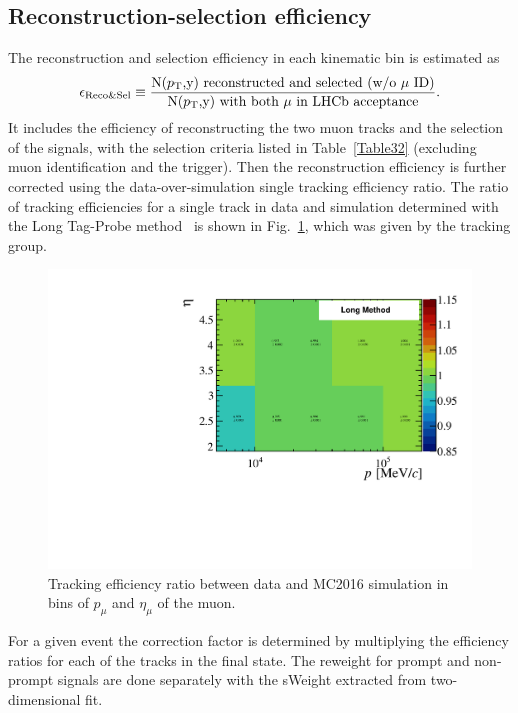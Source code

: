 \subsection{Reconstruction-selection efficiency}
The reconstruction and selection efficiency in each kinematic bin is estimated as
\begin{equation}
\epsilon_{\mathrm{Reco\&Sel}}  \equiv \frac{\mbox{N($p_{\mathrm{T}}$,y) reconstructed and selected (w/o $\mu$ ID)}}{\mbox{N($p_{\mathrm{T}}$,y) with both $\mu$ in LHCb acceptance}}.
\end{equation}
It includes the efficiency of reconstructing the two muon tracks and the selection of the signals, with the selection criteria listed in Table~\ref{Table32} (excluding muon identification and the trigger). 
Then the reconstruction efficiency is further corrected using the data-over-simulation single tracking efficiency ratio.
The ratio of tracking efficiencies for a single track in data and simulation determined with the Long Tag-Probe method~\cite{LHCb-DP-2013-002} is shown in Fig.~\ref{TrackEfficiencyCalib}, which was given by the tracking group.
\begin{figure}[H]
  \begin{center}
    \includegraphics[width=0.8\linewidth]{pdf/TrackCalib.pdf}
  \end{center}
  \caption{
    Tracking efficiency ratio between data and MC2016 simulation in bins of $p_{\mu}$ and $\eta_{\mu}$ 
    of the muon.}
  \label{TrackEfficiencyCalib}
\end{figure}
For a given event the correction factor is determined by multiplying the efficiency ratios for each of the tracks in the final state. The reweight for prompt and non-prompt signals are done separately with the sWeight extracted from two-dimensional fit. 
